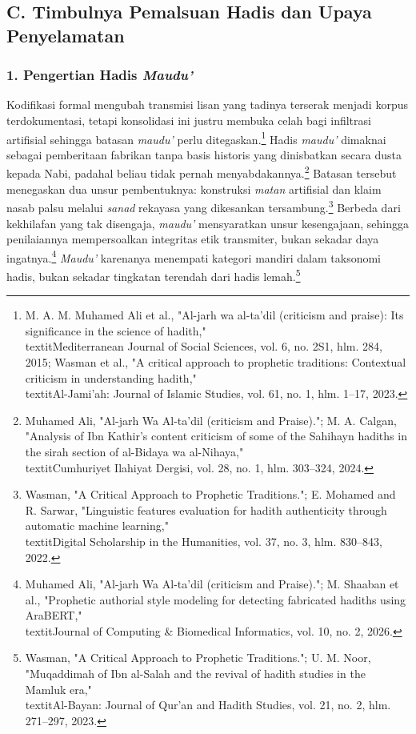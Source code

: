 \subsection*{C. Timbulnya Pemalsuan Hadis dan Upaya Penyelamatan}

\subsubsection*{1. Pengertian Hadis \textit{Maudu'}}

Kodifikasi formal mengubah transmisi lisan yang tadinya terserak menjadi korpus terdokumentasi, tetapi konsolidasi ini justru membuka celah bagi infiltrasi artifisial sehingga batasan \textit{maudu'} perlu ditegaskan.\footnote{M. A. M. Muhamed Ali et al., "Al-jarh wa al-ta'dil (criticism and praise): Its significance in the science of hadith," \\textit{Mediterranean Journal of Social Sciences}, vol. 6, no. 2S1, hlm. 284, 2015; Wasman et al., "A critical approach to prophetic traditions: Contextual criticism in understanding hadith," \\textit{Al-Jami'ah: Journal of Islamic Studies}, vol. 61, no. 1, hlm. 1--17, 2023.} Hadis \textit{maudu'} dimaknai sebagai pemberitaan fabrikan tanpa basis historis yang dinisbatkan secara dusta kepada Nabi, padahal beliau tidak pernah menyabdakannya.\footnote{Muhamed Ali, "Al-jarh Wa Al-ta'dil (criticism and Praise)."; M. A. Calgan, "Analysis of Ibn Kathir's content criticism of some of the Sahihayn hadiths in the sirah section of al-Bidaya wa al-Nihaya," \\textit{Cumhuriyet Ilahiyat Dergisi}, vol. 28, no. 1, hlm. 303--324, 2024.} Batasan tersebut menegaskan dua unsur pembentuknya: konstruksi \textit{matan} artifisial dan klaim nasab palsu melalui \textit{sanad} rekayasa yang dikesankan tersambung.\footnote{Wasman, "A Critical Approach to Prophetic Traditions."; E. Mohamed and R. Sarwar, "Linguistic features evaluation for hadith authenticity through automatic machine learning," \\textit{Digital Scholarship in the Humanities}, vol. 37, no. 3, hlm. 830--843, 2022.} Berbeda dari kekhilafan yang tak disengaja, \textit{maudu'} mensyaratkan unsur kesengajaan, sehingga penilaiannya mempersoalkan integritas etik transmiter, bukan sekadar daya ingatnya.\footnote{Muhamed Ali, "Al-jarh Wa Al-ta'dil (criticism and Praise)."; M. Shaaban et al., "Prophetic authorial style modeling for detecting fabricated hadiths using AraBERT," \\textit{Journal of Computing \& Biomedical Informatics}, vol. 10, no. 2, 2026.} \textit{Maudu'} karenanya menempati kategori mandiri dalam taksonomi hadis, bukan sekadar tingkatan terendah dari hadis lemah.\footnote{Wasman, "A Critical Approach to Prophetic Traditions."; U. M. Noor, "Muqaddimah of Ibn al-Salah and the revival of hadith studies in the Mamluk era," \\textit{Al-Bayan: Journal of Qur'an and Hadith Studies}, vol. 21, no. 2, hlm. 271--297, 2023.}

